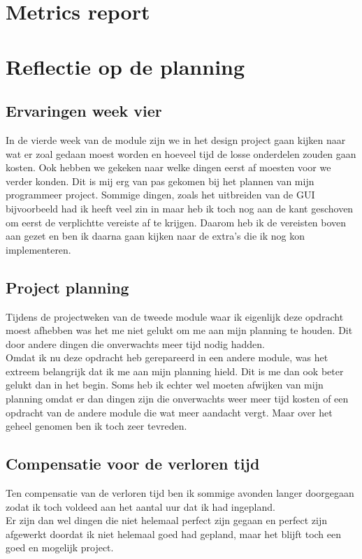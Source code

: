 \documentclass[12pt]{article}
\begin{document}
\section{Metrics report}

\section{Reflectie op de planning}
\subsection{Ervaringen week vier}
In de vierde week van de module zijn we in het design project gaan kijken naar wat er zoal gedaan moest worden en hoeveel tijd de losse onderdelen zouden gaan kosten. Ook hebben we gekeken naar welke dingen eerst af moesten voor we verder konden. Dit is mij erg van pas gekomen bij het plannen van mijn programmeer project. Sommige dingen, zoals het uitbreiden van de GUI bijvoorbeeld had ik heeft veel zin in maar heb ik toch nog aan de kant geschoven om eerst de verplichtte vereiste af te krijgen. Daarom heb ik de vereisten boven aan gezet en ben ik daarna gaan kijken naar de extra's die ik nog kon implementeren.\\
\subsection{Project planning}
Tijdens de projectweken van de tweede module waar ik eigenlijk deze opdracht moest afhebben was het me niet gelukt om me aan mijn planning te houden. Dit door andere dingen die onverwachts meer tijd nodig hadden.\\
Omdat ik nu deze opdracht heb gerepareerd in een andere module, was het extreem belangrijk dat ik me aan mijn planning hield. Dit is me dan ook beter gelukt dan in het begin.  Soms heb ik echter wel moeten afwijken van mijn planning omdat er dan dingen zijn die onverwachts weer meer tijd kosten of een opdracht van de andere module die wat meer aandacht vergt. Maar over het geheel genomen ben ik toch zeer tevreden.
\subsection{Compensatie voor de verloren tijd}
Ten compensatie van de verloren tijd ben ik sommige avonden langer doorgegaan zodat ik toch voldeed aan het aantal uur dat ik had ingepland.\\
Er zijn dan wel dingen die niet helemaal perfect zijn gegaan en perfect zijn afgewerkt doordat ik niet helemaal goed had gepland, maar het blijft toch een goed en mogelijk project.
\end{document}
